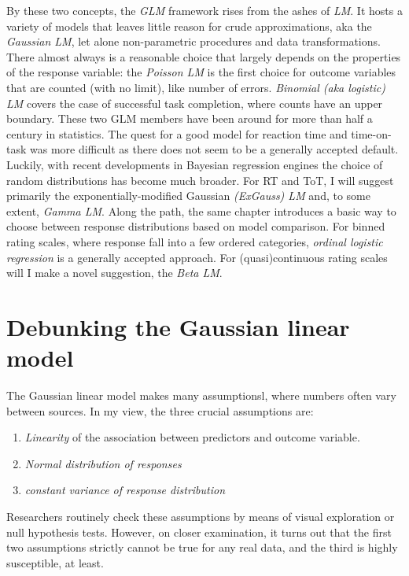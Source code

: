 \documentclass[]{svmono}
\providecommand{\tightlist}{%
  \setlength{\itemsep}{0pt}\setlength{\parskip}{0pt}}
\theoremstyle{definition}
\theoremstyle{definition}
\theoremstyle{definition}
\theoremstyle{remark}
\begin{document}
By these two concepts, the \emph{GLM} framework rises from the ashes of
\emph{LM}. It hosts a variety of models that leaves little reason for
crude approximations, aka the \emph{Gaussian LM}, let alone
non-parametric procedures and data transformations. There almost always
is a reasonable choice that largely depends on the properties of the
response variable: the \emph{Poisson LM} is the first choice for outcome
variables that are counted (with no limit), like number of errors.
\emph{Binomial (aka logistic) LM} covers the case of successful task
completion, where counts have an upper boundary. These two GLM members
have been around for more than half a century in statistics. The quest
for a good model for reaction time and time-on-task was more difficult
as there does not seem to be a generally accepted default. Luckily, with
recent developments in Bayesian regression engines the choice of random
distributions has become much broader. For RT and ToT, I will suggest
primarily the exponentially-modified Gaussian \emph{(ExGauss) LM} and,
to some extent, \emph{Gamma LM}. Along the path, the same chapter
introduces a basic way to choose between response distributions based on
model comparison. For binned rating scales, where response fall into a
few ordered categories, \emph{ordinal logistic regression} is a
generally accepted approach. For (quasi)continuous rating scales will I
make a novel suggestion, the \emph{Beta LM}.

\section{Debunking the Gaussian linear
model}\label{debunking-the-gaussian-linear-model}

The Gaussian linear model makes many assumptionsl, where numbers often
vary between sources. In my view, the three crucial assumptions are:

\begin{enumerate}
\def\labelenumi{\arabic{enumi}.}
\tightlist
\item
  \emph{Linearity} of the association between predictors and outcome
  variable.
\item
  \emph{Normal distribution of responses}
\item
  \emph{constant variance of response distribution}
\end{enumerate}

Researchers routinely check these assumptions by means of visual
exploration or null hypothesis tests. However, on closer examination, it
turns out that the first two assumptions strictly cannot be true for any
real data, and the third is highly susceptible, at least.
\end{document}

